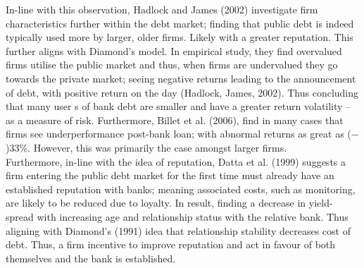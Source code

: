 \documentclass[11pt, english]{article}
\begin{document}
	In-line with this observation, Hadlock and James (2002) investigate firm characteristics further within the debt market; finding that public debt is indeed typically used more by larger, older firms. Likely with a greater reputation. This further aligns with Diamond's model. In empirical study, they find overvalued firms utilise the public market and thus, when firms are undervalued they go towards the private market; seeing negative returns leading to the announcement of debt, with positive return on the day (Hadlock, James, 2002). Thus concluding that many user s of bank debt are smaller and have a greater return volatility – as a measure of risk. Furthermore, Billet et al. (2006), find in many cases that firms see underperformance post-bank loan; with abnormal returns as great as ($-$)33\%. However, this was primarily the case amongst larger firms.\\

	Furthermore, in-line with the idea of reputation, Datta et al. (1999) suggests a firm entering the public debt market for the first time must already have an established reputation with banks; meaning associated costs, such as monitoring, are likely to be reduced due to loyalty. In result, finding a decrease in yield-spread with increasing age and relationship status with the relative bank. Thus aligning with Diamond's (1991) idea that relationship stability decreases cost of debt. Thus, a firm incentive to improve reputation and act in favour of both themselves and the bank is established.
\end{document}
